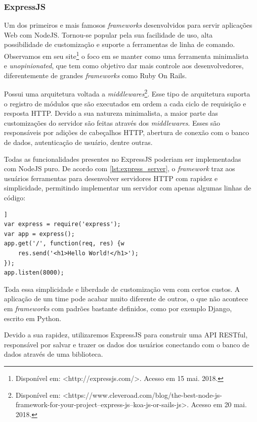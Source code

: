 \subsubsection{ExpressJS}

Um dos primeiros e mais famosos \textit{frameworks} desenvolvidos para servir aplicações Web com NodeJS. Tornou-se popular pela sua facilidade de uso, alta possibilidade de customização e suporte a ferramentas de linha de comando. Observamos em seu site\footnote{Disponível em: <http://expressjs.com/>. Acesso em 15 mai. 2018.} o foco em se manter como uma ferramenta minimalista e \textit{unopinionated}, que tem como objetivo dar mais controle aos desenvolvedores, diferentemente de grandes \textit{frameworks} como Ruby On Rails.

Possui uma arquitetura voltada a \textit{middlewares}\footnote{Disponível em: <https://www.cleveroad.com/blog/the-best-node-js-framework-for-your-project--express-js--koa-js-or-sails-js>. Acesso em 20 mai. 2018.}. Esse tipo de arquitetura suporta o registro de módulos que são executados em ordem a cada ciclo de requisição e resposta HTTP. Devido a sua  natureza minimalista, a maior parte das customizações do servidor são feitas através dos \textit{middlewares}. Esses são responsáveis por adições de cabeçalhos HTTP, abertura de conexão com o banco de dados, autenticação de usuário, dentre outras.

Todas as funcionalidades presentes no ExpressJS poderiam ser implementadas com NodeJS puro. De acordo com \ref{lst:express_server}, o \textit{framework} traz aos usuários ferramentas para desenvolver servidores HTTP com rapidez e simplicidade, permitindo implementar um servidor com apenas algumas linhas de código:

\begin{lstlisting}[caption={Servidor ExpressJS}, label={lst:express_server}]]
var express = require('express');
var app = express();
app.get('/', function(req, res) {w
	res.send('<h1>Hello World!</h1>');
});
app.listen(8000);
\end{lstlisting}

Toda essa simplicidade e liberdade de customização vem com certos custos. A aplicação de um time pode acabar muito diferente de outros, o que não acontece em \textit{frameworks} com padrões bastante definidos, como por exemplo Django, escrito em Python.

Devido a sua rapidez, utilizaremos ExpressJS para construir uma API RESTful, responsável por salvar e trazer os dados dos usuários conectando com o banco de dados através de uma biblioteca.

